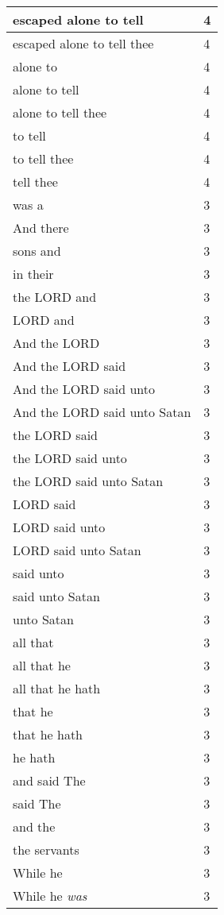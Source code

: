 \begin{center}
\begin{longtable}{|p{3.0in}|p{0.5in}|}
escaped alone to tell & 4\\ \hline 
escaped alone to tell thee & 4\\ \hline 
alone to & 4\\ \hline 
alone to tell & 4\\ \hline 
alone to tell thee & 4\\ \hline 
to tell & 4\\ \hline 
to tell thee & 4\\ \hline 
tell thee & 4\\ \hline 
was a & 3\\ \hline 
And there & 3\\ \hline 
sons and & 3\\ \hline 
in their & 3\\ \hline 
the LORD and & 3\\ \hline 
LORD and & 3\\ \hline 
And the LORD & 3\\ \hline 
And the LORD said & 3\\ \hline 
And the LORD said unto & 3\\ \hline 
And the LORD said unto Satan & 3\\ \hline 
the LORD said & 3\\ \hline 
the LORD said unto & 3\\ \hline 
the LORD said unto Satan & 3\\ \hline 
LORD said & 3\\ \hline 
LORD said unto & 3\\ \hline 
LORD said unto Satan & 3\\ \hline 
said unto & 3\\ \hline 
said unto Satan & 3\\ \hline 
unto Satan & 3\\ \hline 
all that & 3\\ \hline 
all that he & 3\\ \hline 
all that he hath & 3\\ \hline 
that he & 3\\ \hline 
that he hath & 3\\ \hline 
he hath & 3\\ \hline 
and said The & 3\\ \hline 
said The & 3\\ \hline 
and the & 3\\ \hline 
the servants & 3\\ \hline 
While he & 3\\ \hline 
While he \emph{was} & 3\\ \hline 

\end{longtable}
\end{center}
